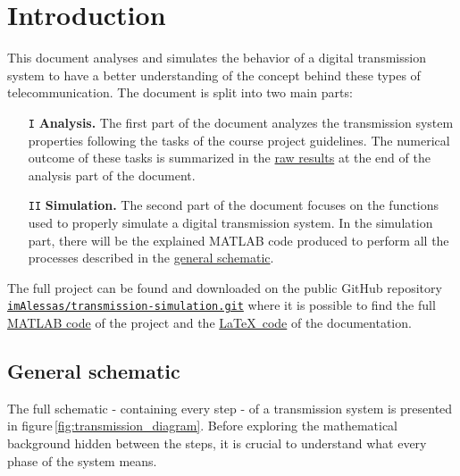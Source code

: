 \setcounter{secnumdepth}{0}
\section{Introduction}
This document analyses and simulates the behavior of a digital transmission system to have a better understanding of the concept behind these types of telecommunication. The document is split into two main parts:

\begin{enumerate}
    \item[\texttt{I}] \hspace{10px} \textbf{Analysis.} The first part of the document analyzes the transmission system properties following the tasks of the course project guidelines. The numerical outcome of these tasks is summarized in the \hyperref[raw-results]{raw results} at the end of the analysis part of the document.
    \item[\texttt{II}] \hspace{10px} \textbf{Simulation.} The second part of the document focuses on the functions used to properly simulate a digital transmission system. In the simulation part, there will be the explained MATLAB code produced to perform all the processes described in the \hyperref[general-schematic]{general schematic}.
\end{enumerate}



\noindent The full project can be found and downloaded on the public GitHub repository \texttt{\href{https://github.com/imAlessas/transmission-simulation.git}{imAlessas/transmission-simulation.git}} where it is possible to find the full \href{https://github.com/imAlessas/transmission-simulation/tree/main/src}{MATLAB code} of the project and the \href{https://github.com/imAlessas/transmission-simulation/tree/main/doc}{\LaTeX\, code} of the documentation.


\subsection{General schematic}\label{general-schematic}
The full schematic - containing every step - of a transmission system is presented in figure\,\ref{fig:transmission_diagram}. Before exploring the mathematical background hidden between the steps, it is crucial to understand what every phase of the system means.

